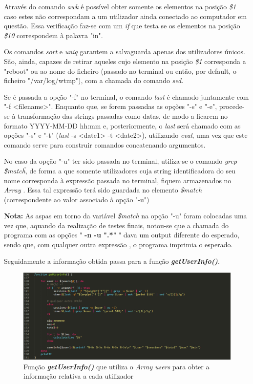 \documentclass[10pt,portuguese]{article}
\begin{document}
\par Através do comando \textit{awk} é possível obter somente os elementos na posição \textit{\$1} caso estes não correspondam a um utilizador ainda conectado ao computador em questão. Essa verificação faz-se com um \textit{if} que testa se os elementos na posição \textit{\$10} correspondem à palavra "in".
\par Os comandos \textit{sort} e \textit{uniq} garantem a salvaguarda apenas dos utilizadores únicos. São, ainda, capazes de retirar aqueles cujo elemento na posição \textit{\$1} corresponda a "reboot" ou ao nome do ficheiro (passado no terminal ou então, por default, o ficheiro "/var/log/wtmp"), com a chamada do comando \textit{sed}. 
\par Se é passada a opção "-f" no terminal, o comando \textit{last} é chamado juntamente com "-f <filename>". Enquanto que, se forem passadas as opções "-s" e "-e",  procede-se à transformação das strings passadas como datas, de modo a ficarem no formato YYYY-MM-DD hh:mm e, posteriormente, o \textit{last} será chamado com as opções "-s" e "-t" (\textit{last} -s <date1> -t <date2>), utilizando \textit{eval}, uma vez que este comando serve para construir comandos concatenando argumentos.
\par No caso da opção "-u" ter sido passada no terminal, utiliza-se o comando \textit{grep \"\$match\"}, de forma a que somente utilizadores cuja string identificadora do seu nome corresponda à expressão passada no terminal, fiquem armazenados no \textit{Array} . Essa tal expressão terá sido guardada no elemento \textit{\$match} (correspondente ao valor associado à opção "-u")
\par \textbf{Nota:} As aspas em torno da variável \textit{\$match} na opção "-u" foram colocadas uma vez que, aquando da realização de testes finais, notou-se que a chamada do programa com as opções "  \textbf{-n -u ".*"  }" dava um output diferente do esperado, sendo que, com qualquer outra expressão , o programa imprimia o esperado. 
\newline
\newline
\par Seguidamente a informação obtida passa para a função \textbf{\textit{getUserInfo()}}.
\begin{figure}[!h]
    \centering
    \includegraphics[width=\textwidth]{getUsersInfo.png}
    \caption{Função \textbf{\textit{getUserInfo()}} que utiliza o \textit{Array} \textit{users} para obter a informação relativa a cada utilizador}
\end{figure}
\end{document}
